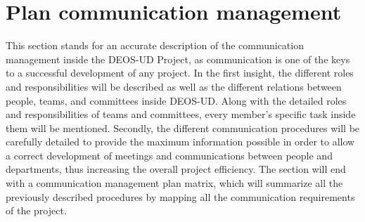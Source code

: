 \chapter{Plan communication management}
This section stands for an accurate description of the communication management inside the DEOS-UD Project, as communication is one of the keys to a successful development of any project. 
In the first insight, the different roles and responsibilities will be described as well as the different relations between people, teams, and committees inside DEOS-UD. Along with the detailed roles and responsibilities of teams and committees, every member’s specific task inside them will be mentioned. 
Secondly, the different communication procedures will be carefully detailed to provide the maximum information possible in order to allow a correct development of meetings and communications between people and departments, thus increasing the overall project efficiency. 
The section will end with a communication management plan matrix, which will summarize all the previously described procedures by mapping all the communication requirements of the project. 



